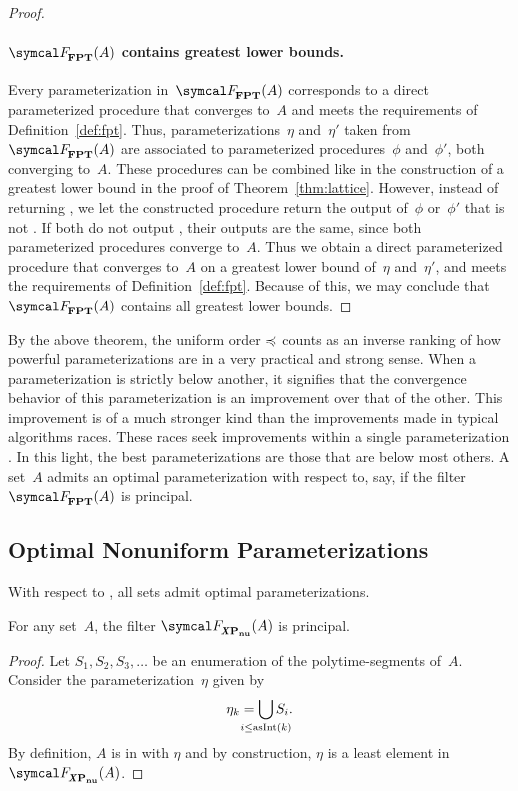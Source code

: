 \begin{proof}
  \paragraph{$\calF_\cl{FPT}(A)$ contains greatest lower bounds.}
  Every parameterization in~$\calF_\cl{FPT}(A)$ corresponds to a direct parameterized procedure that converges to~$A$ and meets the requirements of Definition~\ref{def:fpt}.
  Thus, parameterizations~$\eta$ and~$\eta'$ taken from $\calF_\cl{FPT}(A)$ are associated to parameterized procedures~$\phi$ and~$\phi'$, both converging to~$A$.
  These procedures can be combined like in the construction of a greatest lower bound in the proof of Theorem~\ref{thm:lattice}.
  However, instead of returning , we let the constructed procedure return the output of~$\phi$ or~$\phi'$ that is not .
  If both do not output , their outputs are the same, since both parameterized procedures converge to~$A$.
  Thus we obtain a direct parameterized procedure that converges to~$A$ on a greatest lower bound of~$\eta$ and~$\eta'$, and meets the requirements of Definition~\ref{def:fpt}.
  Because of this, we may conclude that $\calF_\cl{FPT}(A)$ contains all greatest lower bounds.
\end{proof}

By the above theorem, the uniform order $\preccurlyeq$ counts as an inverse ranking of how powerful parameterizations are in a very practical and strong sense.
When a parameterization is strictly below another, it signifies that the convergence behavior of this parameterization is an improvement over that of the other.
This improvement is of a much stronger kind than the improvements made in typical algorithms races.
These races seek improvements within a single parameterization \parencite{komusiewicz2012new,fellows2013towards}.
In this light, the best parameterizations are those that are below most others.
A set~$A$ admits an optimal parameterization with respect to, say,  if the filter $\calF_\cl{FPT}(A)$ is principal.

\subsection{Optimal Nonuniform Parameterizations}
With respect to , all sets admit optimal parameterizations.
\begin{theorem}
\label{thm:nuxpprincipal}%
  For any set~$A$, the filter $\calF_\clXnu{P}(A)$ is principal.
\end{theorem}
\begin{proof}
  Let $S_1, S_2, S_3, \ldots$ be an enumeration of the polytime-segments of~$A$.
  Consider the parameterization~$\eta$ given by
  \begin{equation*}
    \eta_k \deq \bigcup_{\mathclap{i \le \asNat(k)}} S_i.
  \end{equation*}
  By definition, $A$ is in  with $\eta$ and by construction, $\eta$ is a least element in~$\calF_\clXnu{P}(A)$.
\end{proof}

